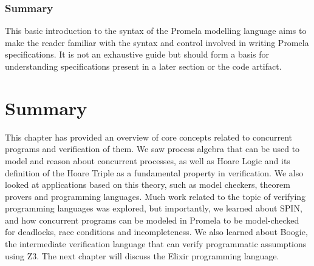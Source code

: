 \subsubsection[]{Summary}
This basic introduction to the syntax of the Promela modelling language aims to make the reader familiar with the syntax and control involved in writing Promela specifications. It is not an exhaustive guide but should form a basis for understanding specifications present in a later section or the code artifact.
\section{Summary}
This chapter has provided an overview of core concepts related to concurrent programs and verification of them. We saw process algebra that can be used to model and reason about concurrent processes, as well as Hoare Logic and its definition of the Hoare Triple as a fundamental property in verification. We also looked at applications based on this theory, such as model checkers, theorem provers and programming languages. Much work related to the topic of verifying programming languages was explored, but importantly, we learned about SPIN, and how concurrent programs can be modeled in Promela to be model-checked for deadlocks, race conditions and incompleteness. We also learned about Boogie, the intermediate verification language that can verify programmatic assumptions using Z3. The next chapter will discuss the Elixir programming language.

